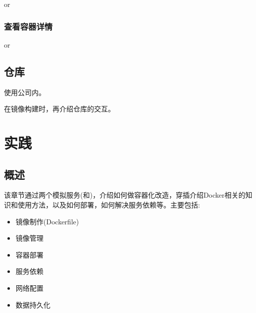 \documentclass[letterpaper,10pt,english]{sphinxmanual}
\begin{document}
or

\begin{sphinxVerbatim}[commandchars=\\\{\}]
    
\end{sphinxVerbatim}


\subsection{查看容器详情}
\label{\detokenize{docker/basic_cmd:id19}}
\begin{sphinxVerbatim}[commandchars=\\\{\}]
   
\end{sphinxVerbatim}

or

\begin{sphinxVerbatim}[commandchars=\\\{\}]
   
\end{sphinxVerbatim}


\section{仓库}
\label{\detokenize{docker/basic_cmd:id20}}
使用公司内。

在镜像构建时，再介绍仓库的交互。


\chapter{实践}
\label{\detokenize{docker/practice:id1}}\label{\detokenize{docker/practice::doc}}

\section{概述}
\label{\detokenize{docker/practice:id2}}
该章节通过两个模拟服务(和)，介绍如何做容器化改造，穿插介绍Docker相关的知识和使用方法，以及如何部署，如何解决服务依赖等。主要包括:
\begin{itemize}
\item {} 
镜像制作(Dockerfile)

\item {} 
镜像管理

\item {} 
容器部署

\item {} 
服务依赖

\item {} 
网络配置

\item {} 
数据持久化

\end{itemize}
\end{document}
